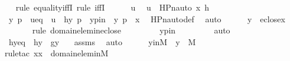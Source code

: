 \begin{isabellebody}
\ \ \isamarkupfalse%
{\isacharparenleft}{\kern0pt}rule\ equality{\isacharunderscore}{\kern0pt}iffI{\isacharcomma}{\kern0pt}\ rule\ iffI{\isacharparenright}{\kern0pt}\isanewline
\ \ \ \ \isamarkupfalse%
\ u\ \isamarkupfalse%
\ {\isachardoublequoteopen}u\ {\isasymin}\ HPn{\isacharunderscore}{\kern0pt}auto{\isacharparenleft}{\kern0pt}{\isasympi}{\isacharcomma}{\kern0pt}\ x{\isacharcomma}{\kern0pt}\ h{\isacharparenright}{\kern0pt}{\isachardoublequoteclose}\ \isanewline
\ \ \ \ \isamarkupfalse%
\ \isamarkupfalse%
\ y\ p\ \ ueq\ {\isacharcolon}{\kern0pt}\ {\isachardoublequoteopen}u\ {\isacharequal}{\kern0pt}\ {\isacharless}{\kern0pt}h{\isacharbackquote}{\kern0pt}y{\isacharcomma}{\kern0pt}\ {\isasympi}{\isacharbackquote}{\kern0pt}p{\isachargreater}{\kern0pt}{\isachardoublequoteclose}\ \ ypin\ {\isacharcolon}{\kern0pt}\ {\isachardoublequoteopen}{\isacharless}{\kern0pt}y{\isacharcomma}{\kern0pt}\ p{\isachargreater}{\kern0pt}\ {\isasymin}\ x{\isachardoublequoteclose}\ \isamarkupfalse%
\ HPn{\isacharunderscore}{\kern0pt}auto{\isacharunderscore}{\kern0pt}def\ \isamarkupfalse%
\ auto\isanewline
\ \ \ \ \isamarkupfalse%
\ {\isachardoublequoteopen}y\ {\isasymin}\ eclose{\isacharparenleft}{\kern0pt}x{\isacharparenright}{\kern0pt}{\isachardoublequoteclose}\ \isanewline
\ \ \ \ \ \ \isamarkupfalse%
{\isacharparenleft}{\kern0pt}rule\ domain{\isacharunderscore}{\kern0pt}elem{\isacharunderscore}{\kern0pt}in{\isacharunderscore}{\kern0pt}eclose{\isacharparenright}{\kern0pt}\ \isanewline
\ \ \ \ \ \ \isamarkupfalse%
\ ypin\ \isanewline
\ \ \ \ \ \ \isamarkupfalse%
\ auto\isanewline
\ \ \ \ \isamarkupfalse%
\ \isamarkupfalse%
\ hyeq\ {\isacharcolon}{\kern0pt}\ {\isachardoublequoteopen}h{\isacharbackquote}{\kern0pt}y\ {\isacharequal}{\kern0pt}\ g{\isacharbackquote}{\kern0pt}{\isacharless}{\kern0pt}y{\isacharcomma}{\kern0pt}\ {\isasympi}{\isachargreater}{\kern0pt}{\isachardoublequoteclose}\ \isamarkupfalse%
\ assms{}\ \isamarkupfalse%
\ auto\isanewline
\isanewline
\ \ \ \ \isamarkupfalse%
\ yinM\ {\isacharcolon}{\kern0pt}\ {\isachardoublequoteopen}y\ {\isasymin}\ M{\isachardoublequoteclose}\isanewline
\ \ \ \ \ \ \isamarkupfalse%
{\isacharparenleft}{\kern0pt}rule{\isacharunderscore}{\kern0pt}tac\ x{\isacharequal}{\kern0pt}x\ \ domain{\isacharunderscore}{\kern0pt}elem{\isacharunderscore}{\kern0pt}in{\isacharunderscore}{\kern0pt}M{\isacharparenright}{\kern0pt}\isanewline

\end{isabellebody}
